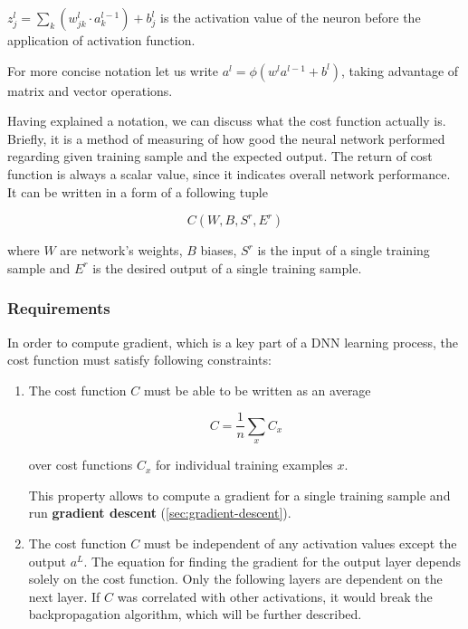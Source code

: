 $z^l_j = \sum_k (w^l_{jk} \cdot a^{l-1}_k) + b^l_j$ is the activation value of the neuron before the application of activation function.

\vspace{.5cm}

For more concise notation let us write $a^l = \phi(w^l a^{l-1} + b^l)$, taking advantage of matrix and vector operations.

Having explained a notation, we can discuss what the cost function actually is. Briefly, it is a method of measuring of how good the neural network performed regarding given training sample and the expected output. The return of cost function is always a scalar value, since it indicates overall network performance. It can be written in a form of a following tuple

\begin{equation}
    C(W, B, S^r, E^r)
\end{equation}

where $W$ are network's weights, $B$ biases, $S^r$ is the input of a single training sample and $E^r$ is the desired output of a single training sample.

\subsubsection*{Requirements}
\label{sub2:cost-requirements}

In order to compute gradient, which is a key part of a DNN learning process, the cost function must satisfy following constraints:

\begin{enumerate}
    \item The cost function $C$ must be able to be written as an average
    
        \[C = \frac{1}{n} \sum_x C_x\]
        
        over cost functions $C_x$ for individual training examples $x$.
    
        This property allows to compute a gradient for a single training sample and run \textbf{gradient descent} (\ref{sec:gradient-descent}).
    
    \item The cost function $C$ must be independent of any activation values except the output $a^L$.
    The equation for finding the gradient for the output layer depends solely on the cost function. Only the following layers are dependent on the next layer. If $C$ was correlated with other activations, it would break the backpropagation algorithm, which will be further described.
\end{enumerate}

